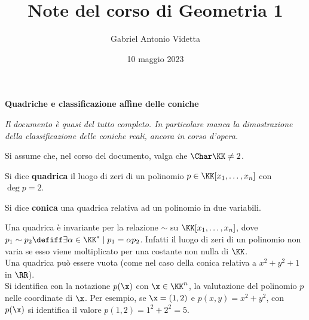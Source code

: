 \documentclass[11pt]{article}
\title{\textbf{Note del corso di Geometria 1}}
\author{Gabriel Antonio Videtta}
\date{10 maggio 2023}
\begin{document}
	
	\maketitle
	
	\begin{center}
		\Large \textbf{Quadriche e classificazione affine delle coniche}
	\end{center}
	
	\begin{center}\textit{Il documento è quasi del tutto completo. In particolare manca la dimostrazione della classificazione delle coniche reali, ancora in corso d'opera.}\end{center}
	
	\begin{note}
		Si assume che, nel corso del documento, valga che $\Char \KK \neq 2$.
	\end{note}
	
	\begin{definition}[quadriche] Si dice \textbf{quadrica} il luogo di zeri
		di un polinomio $p \in \KK[x_1, \ldots, x_n]$ con $\deg p = 2$.
	\end{definition}
	
	\begin{definition}[coniche] Si dice \textbf{conica} una quadrica relativa ad un polinomio
		in due variabili.
	\end{definition}
	
	\begin{remark}\nl
		\li Una quadrica è invariante per la relazione $\sim$ su $\KK[x_1, \ldots, x_n]$, dove
		$p_1 \sim p_2 \defiff \exists \alpha \in \KK^* \mid p_1 = \alpha p_2$. Infatti
		il luogo di zeri di un polinomio non varia se esso viene moltiplicato per una costante non nulla di $\KK$. \\
		\li Una quadrica può essere vuota (come nel caso della conica relativa a $x^2 + y^2 + 1$ in $\RR$). \\
		\li Si identifica con la notazione $p(\x)$ con $\x \in \KK^n$, la valutazione del polinomio $p$ nelle coordinate
		di $\x$. Per esempio, se $\x = (1, 2)$ e $p(x, y) = x^2 + y^2$, con $p(\x)$ si identifica il valore
		$p(1, 2) = 1^2 + 2^2 = 5$.
	\end{remark}
	
\end{document}
